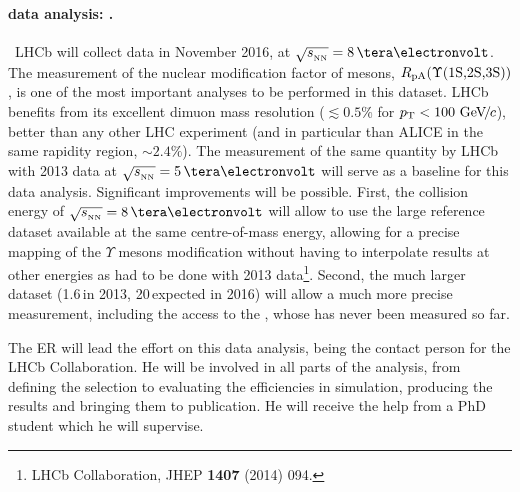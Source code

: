 \documentclass[a4paper,11pt]{article}
\newcommand{\ER}{ER\xspace}
\begin{document}
\paragraph{\pPb data analysis: \PgUabc. }\ 
LHCb will collect \pPb data in November 2016, at $\sqrtsnn = 8\,\TeV$. The measurement of the nuclear modification factor of \PgU mesons, $R_{\text{pA}} (\Upsilon\text{(1S,2S,3S)})$, is one of the most important analyses to be performed in this dataset. LHCb benefits from its excellent dimuon mass resolution ($\lesssim 0.5\%$ for $p_{\text{T}} < 100\,{\,\text{Ge\hspace{-.08em}V\hspace{-0.16em}/\hspace{-0.08em}}c}$), %
better than any other LHC experiment (and in particular than ALICE in the same rapidity region, $\sim 2.4\%$). %
The measurement of the same quantity by LHCb with 2013 \pPb data at $\sqrtsnn = 5\,\TeV$ will serve as a baseline for this data analysis. Significant improvements will be possible. First, the collision energy of $\sqrtsnn = 8\,\TeV$ will allow to use the large \pp reference dataset available at the same centre-of-mass energy, allowing for a precise mapping of the $\Upsilon$ mesons modification without having to interpolate results at other energies as had to be done with 2013 \pPb data\footnote{LHCb Collaboration,
  JHEP {\bf 1407} (2014) 094.
  }.
Second, the much larger dataset (1.6\,\nbinv in 2013, 20\,\nbinv expected in 2016) will allow a much more precise measurement, including the access to the \PgUc, whose \rpa has never been measured so far.

The \ER will lead the effort on this data analysis, being the contact person for the LHCb Collaboration. He will be involved in all parts of the analysis, from defining the selection to evaluating the efficiencies in simulation, producing the results and bringing them to publication. He will receive the help from a PhD student which he will supervise.
\end{document}
